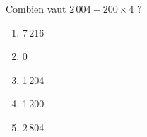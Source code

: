 Combien vaut $2\,004-200\times4$ ?
\begin{multicols}{5}
  \begin{enumerate}[A/]
  \item 7\,216
  \item 0
  \item 1\,204
  \item 1\,200
  \item 2\,804
  \end{enumerate}
\end{multicols}
